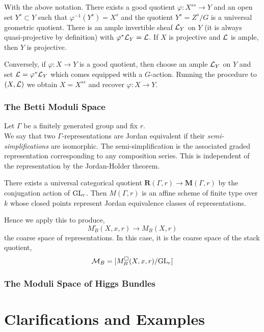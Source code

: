 \documentclass[12pt]{article}
\begin{document}
\begin{prop}
With the above notation. There exists a good quotient $\varphi : X^{ss} \to Y$ and an open set $Y^s \subset Y$ such that $\varphi^{-1}(Y^s) = X^s$ and the quotient $Y^s = Z^s / G$ is a universal geometric quotient. There is an ample invertible sheaf $\mathcal{L}_Y$ on $Y$ (it is always quasi-projective by definition) with $\varphi^* \mathcal{L}_Y = \mathcal{L}$. If $X$ is projective and $\mathcal{L}$ is ample, then $Y$ is projective. 
\end{prop}

Conversely, if $\varphi : X \to Y$ is a good quotient, then choose an ample $\mathcal{L}_Y$ on $Y$ and set $\mathcal{L} = \varphi^* \mathcal{L}_Y$ which comes equipped with a $G$-action. Running the procedure to $(X, \mathcal{L})$ we obtain $X = X^{ss}$ and recover $\varphi : X \to Y$.

\subsubsection{The Betti Moduli Space}

Let $\Gamma$ be a finitely generated group and fix $r$.
\bigskip\\
We say that two $\Gamma$-representations are Jordan equivalent if their \textit{semi-simplifications} are isomorphic. The semi-simplification is the associated graded representation corresponding to any composition series. This is independent of the representation by the Jordan-Holder theorem.


\begin{thm}
There exists a universal categorical quotient $\mathbf{R}(\Gamma, r) \to \mathbf{M}(\Gamma, r)$ by the conjugation action of $\mathrm{GL}_r$. Then $M(\Gamma, r)$ is an affine scheme of finite type over $k$ whose closed points represent Jordan equivalence classes of representations.
\end{thm}

Hence we apply this to produce,
\[ M^\square_B(X, x, r) \to M_B(X, r) \]
the coarse space of representations. In this case, it is the coarse space of the stack quotient,
\[ \mathcal{M}_B = [M^\square_B(X, x, r) / \mathrm{GL}_r] \]

\subsubsection{The Moduli Space of Higgs Bundles}



\section{Clarifications and Examples}
\end{document}
